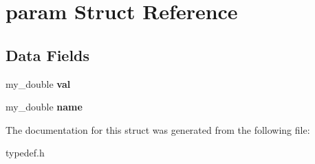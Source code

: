 \hypertarget{structparam}{\section{param Struct Reference}
\label{structparam}
}
\subsection*{Data Fields}
\begin{DoxyCompactItemize}
\item 
\hypertarget{structparam_ab9847dc31766040bc106f260e2d75796}{my\-\_\-double {\bfseries val}}\label{structparam_ab9847dc31766040bc106f260e2d75796}

\item 
\hypertarget{structparam_aade9583f6d0ee5750d6d15e317f44083}{my\-\_\-double {\bfseries name}}\label{structparam_aade9583f6d0ee5750d6d15e317f44083}

\end{DoxyCompactItemize}


The documentation for this struct was generated from the following file\-:\begin{DoxyCompactItemize}
\item 
typedef.\-h\end{DoxyCompactItemize}
